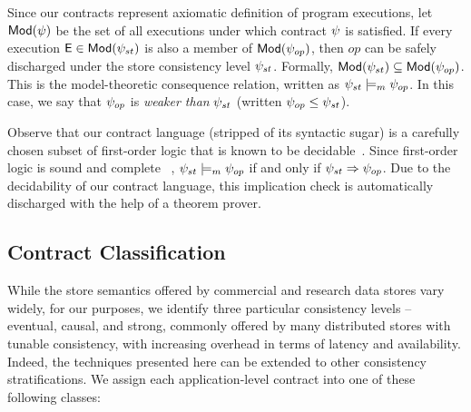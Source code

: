 Since our contracts represent axiomatic definition of program
executions, let ${\normalfont \textsf{Mod}}(\psi)$ be the set of all executions under which
contract $\psi$ is satisfied. If every execution ${\normalfont \textsf{E}} \in
{\normalfont \textsf{Mod}}(\psi_{st})$ is also a member of ${\normalfont \textsf{Mod}}(\psi_{op})$, then $op$ can be
safely discharged under the store consistency level $\psi_{st}$.
Formally, ${\normalfont \textsf{Mod}}(\psi_{st}) \subseteq {\normalfont \textsf{Mod}}(\psi_{op})$. This is the
model-theoretic consequence relation, written as $\psi_{st} \models_m
\psi_{op}$. In this case, we say that $\psi_{op}$ is \emph{weaker than}
$\psi_{st}$ (written $\psi_{op} \le \psi_{st}$). 

Observe that our contract language (stripped of its syntactic sugar) is a
carefully chosen subset of first-order logic that is known to be
decidable~\cite{epr}.  Since first-order logic is sound and complete
~\cite{completeness}, $\psi_{st} \models_m \psi_{op}$ if and only if
$\psi_{st} \Rightarrow \psi_{op}$.  Due to the decidability of our
contract language, this implication check is automatically discharged
with the help of a theorem prover. 

\subsection{Contract Classification}

While the store semantics offered by commercial and research data stores
vary widely, for our purposes, we identify three particular consistency
levels -- eventual, causal, and strong, commonly offered by many distributed
stores with tunable consistency, with increasing overhead in terms of
latency and availability. Indeed, the techniques presented here can be
extended to other consistency stratifications. We assign each
application-level contract into one of these following classes:


